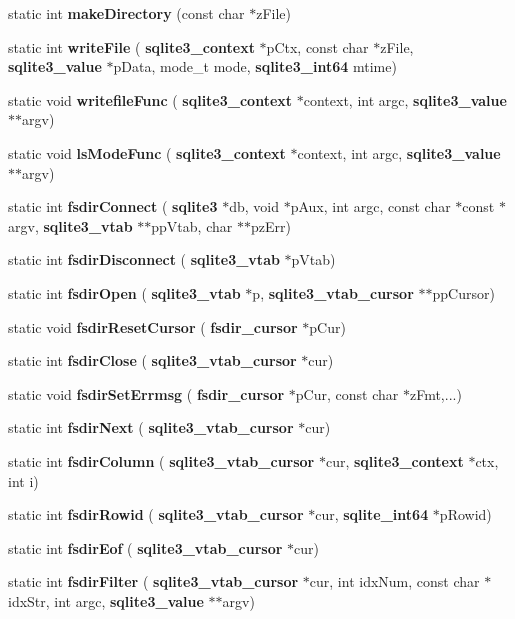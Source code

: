 \begin{DoxyCompactItemize}
\item 
static int \textbf{ make\+Directory} (const char $\ast$z\+File)
\item 
static int \textbf{ write\+File} (\textbf{ sqlite3\+\_\+context} $\ast$p\+Ctx, const char $\ast$z\+File, \textbf{ sqlite3\+\_\+value} $\ast$p\+Data, mode\+\_\+t mode, \textbf{ sqlite3\+\_\+int64} mtime)
\item 
static void \textbf{ writefile\+Func} (\textbf{ sqlite3\+\_\+context} $\ast$context, int argc, \textbf{ sqlite3\+\_\+value} $\ast$$\ast$argv)
\item 
static void \textbf{ ls\+Mode\+Func} (\textbf{ sqlite3\+\_\+context} $\ast$context, int argc, \textbf{ sqlite3\+\_\+value} $\ast$$\ast$argv)
\item 
static int \textbf{ fsdir\+Connect} (\textbf{ sqlite3} $\ast$db, void $\ast$p\+Aux, int argc, const char $\ast$const $\ast$argv, \textbf{ sqlite3\+\_\+vtab} $\ast$$\ast$pp\+Vtab, char $\ast$$\ast$pz\+Err)
\item 
static int \textbf{ fsdir\+Disconnect} (\textbf{ sqlite3\+\_\+vtab} $\ast$p\+Vtab)
\item 
static int \textbf{ fsdir\+Open} (\textbf{ sqlite3\+\_\+vtab} $\ast$p, \textbf{ sqlite3\+\_\+vtab\+\_\+cursor} $\ast$$\ast$pp\+Cursor)
\item 
static void \textbf{ fsdir\+Reset\+Cursor} (\textbf{ fsdir\+\_\+cursor} $\ast$p\+Cur)
\item 
static int \textbf{ fsdir\+Close} (\textbf{ sqlite3\+\_\+vtab\+\_\+cursor} $\ast$cur)
\item 
static void \textbf{ fsdir\+Set\+Errmsg} (\textbf{ fsdir\+\_\+cursor} $\ast$p\+Cur, const char $\ast$z\+Fmt,...)
\item 
static int \textbf{ fsdir\+Next} (\textbf{ sqlite3\+\_\+vtab\+\_\+cursor} $\ast$cur)
\item 
static int \textbf{ fsdir\+Column} (\textbf{ sqlite3\+\_\+vtab\+\_\+cursor} $\ast$cur, \textbf{ sqlite3\+\_\+context} $\ast$ctx, int i)
\item 
static int \textbf{ fsdir\+Rowid} (\textbf{ sqlite3\+\_\+vtab\+\_\+cursor} $\ast$cur, \textbf{ sqlite\+\_\+int64} $\ast$p\+Rowid)
\item 
static int \textbf{ fsdir\+Eof} (\textbf{ sqlite3\+\_\+vtab\+\_\+cursor} $\ast$cur)
\item 
static int \textbf{ fsdir\+Filter} (\textbf{ sqlite3\+\_\+vtab\+\_\+cursor} $\ast$cur, int idx\+Num, const char $\ast$idx\+Str, int argc, \textbf{ sqlite3\+\_\+value} $\ast$$\ast$argv)
\item 

\end{DoxyCompactItemize}

